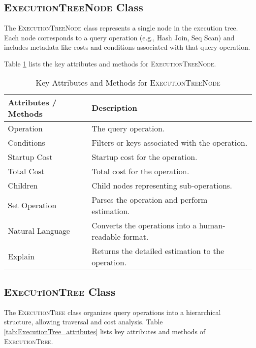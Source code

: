 \subsection{\textsc{ExecutionTreeNode} Class}
\label{sec:execution_tree_node}

The \textsc{ExecutionTreeNode} class represents a single node in the execution tree. Each node corresponds to a query operation (e.g., Hash Join, Seq Scan) and includes metadata like costs and conditions associated with that query operation.

Table \ref{tab:ExecutionTreeNode_attributes} lists the key attributes and methods for \textsc{ExecutionTreeNode}.

\begin{table}[ht]
    \centering
    \begin{tabular}{l|l}
    \toprule
        \textbf{Attributes / Methods} & \textbf{Description} \\
    \midrule
        Operation & The query operation. \\
        Conditions & Filters or keys associated with the operation.\\
        Startup Cost & Startup cost for the operation.\\
        Total Cost & Total cost for the operation.\\
        Children & Child nodes representing sub-operations.\\
    \midrule
        Set Operation & Parses the operation and perform estimation.\\
        Natural Language & Converts the operations into a human-readable format.\\
        Explain & Returns the detailed estimation to the operation. \\
    \bottomrule
    \end{tabular}
    \caption{Key Attributes and Methods for \textsc{ExecutionTreeNode}}
    \label{tab:ExecutionTreeNode_attributes}
\end{table}


\subsection{\textsc{ExecutionTree} Class}
\label{sec:execution_tree}

The \textsc{ExecutionTree} class organizes query operations into a hierarchical structure, allowing traversal and cost analysis. Table \ref{tab:ExecutionTree_attributes} lists key attributes and methods of \textsc{ExecutionTree}.


